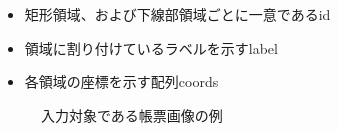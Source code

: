 \begin{itemize}
    \item 矩形領域、および下線部領域ごとに一意であるid
    \item 領域に割り付けているラベルを示すlabel
    \item 各領域の座標を示す配列coords
\end{itemize}


\begin{figure}[t]
    \begin{center}
        \caption{入力対象である帳票画像の例}
        \label{fig:original}
    \end{center}
\end{figure}


